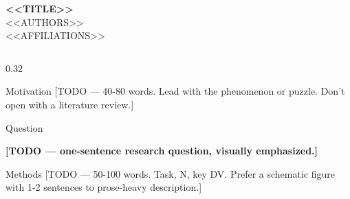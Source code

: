 \setlength{\parskip}{0.5em}
\setlength{\itemsep}{0.3em}



\begin{frame}[t]{}

\begin{tcolorbox}[colback=cmlblue, colframe=cmlblue, arc=5pt,
                  boxsep=12pt, left=20pt, right=20pt, top=8pt, bottom=8pt]
  \begin{center}
    {\fontsize{80}{96}\selectfont\bfseries\color{white} <<TITLE>>} \\[0.5em]
    {\Large\color{white} <<AUTHORS>>} \\[0.3em]
    {\normalsize\color{white} <<AFFILIATIONS>>}
  \end{center}
\end{tcolorbox}
\vspace{1.5em}

\begin{columns}[T]

\begin{column}{0.32\textwidth}

\begin{block}{Motivation}
  [TODO — 40-80 words. Lead with the phenomenon or puzzle. Don't open
  with a literature review.]
\end{block}

\begin{block}{Question}
  \begin{center}
    \bfseries [TODO — one-sentence research question, visually emphasized.]
  \end{center}
\end{block}

\begin{block}{Methods}
  [TODO — 50-100 words. Task, N, key DV. Prefer a schematic figure
  with 1-2 sentences to prose-heavy description.]

\end{block}


\end{column}
\end{columns}
\end{frame}
